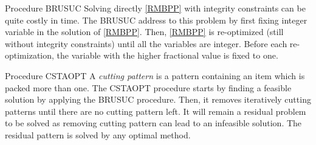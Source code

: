 \begin{paragraph}{Procedure BRUSUC}
	Solving directly \eqref{RMBPP} with integrity constraints can be quite costly in time. The BRUSUC address to this problem by first fixing integer variable in the solution of \eqref{RMBPP}. Then, \eqref{RMBPP} is re-optimized (still without integrity constraints) until all the variables are integer. Before each re-optimization, the variable with the higher fractional value is fixed to one.
\end{paragraph}

\begin{paragraph}{Procedure CSTAOPT}
	A \textit{cutting pattern} is a pattern containing an item which is packed more than one. The CSTAOPT procedure starts by finding a feasible solution by applying the BRUSUC procedure. Then, it removes iteratively cutting patterns until there are no cutting pattern left. It will remain a residual problem to be solved as removing cutting pattern can lead to an infeasible solution. The residual pattern is solved by any optimal method.
\end{paragraph}